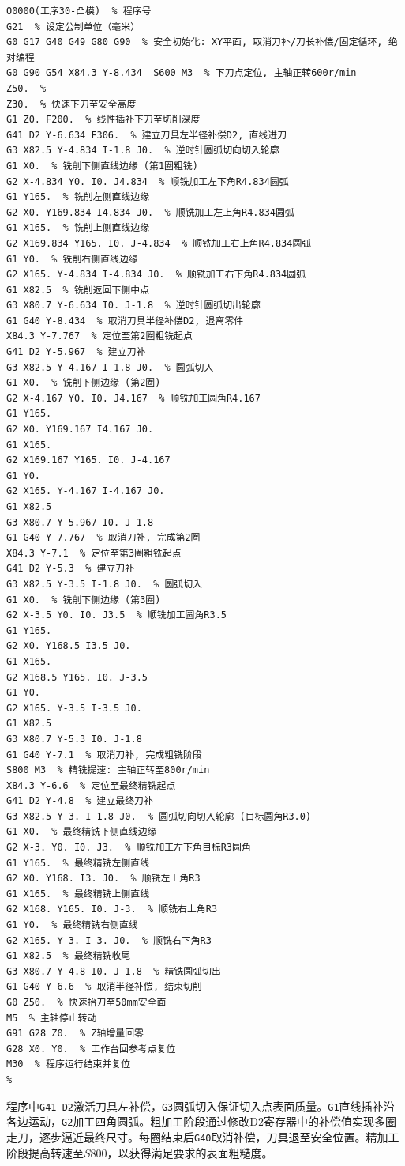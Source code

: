 \documentclass{xautCADreport}
\begin{document}
\begin{lstlisting}[caption={工序30凸模铣侧面程序}]
%
O0000(工序30-凸模)  % 程序号
G21  % 设定公制单位（毫米）
G0 G17 G40 G49 G80 G90  % 安全初始化: XY平面, 取消刀补/刀长补偿/固定循环, 绝对编程
G0 G90 G54 X84.3 Y-8.434  S600 M3  % 下刀点定位, 主轴正转600r/min
Z50.  % 
Z30.  % 快速下刀至安全高度
G1 Z0. F200.  % 线性插补下刀至切削深度
G41 D2 Y-6.634 F306.  % 建立刀具左半径补偿D2, 直线进刀
G3 X82.5 Y-4.834 I-1.8 J0.  % 逆时针圆弧切向切入轮廓
G1 X0.  % 铣削下侧直线边缘 (第1圈粗铣)
G2 X-4.834 Y0. I0. J4.834  % 顺铣加工左下角R4.834圆弧
G1 Y165.  % 铣削左侧直线边缘
G2 X0. Y169.834 I4.834 J0.  % 顺铣加工左上角R4.834圆弧
G1 X165.  % 铣削上侧直线边缘
G2 X169.834 Y165. I0. J-4.834  % 顺铣加工右上角R4.834圆弧
G1 Y0.  % 铣削右侧直线边缘
G2 X165. Y-4.834 I-4.834 J0.  % 顺铣加工右下角R4.834圆弧
G1 X82.5  % 铣削返回下侧中点
G3 X80.7 Y-6.634 I0. J-1.8  % 逆时针圆弧切出轮廓
G1 G40 Y-8.434  % 取消刀具半径补偿D2, 退离零件
X84.3 Y-7.767  % 定位至第2圈粗铣起点
G41 D2 Y-5.967  % 建立刀补
G3 X82.5 Y-4.167 I-1.8 J0.  % 圆弧切入
G1 X0.  % 铣削下侧边缘 (第2圈)
G2 X-4.167 Y0. I0. J4.167  % 顺铣加工圆角R4.167
G1 Y165.
G2 X0. Y169.167 I4.167 J0.
G1 X165.
G2 X169.167 Y165. I0. J-4.167
G1 Y0.
G2 X165. Y-4.167 I-4.167 J0.
G1 X82.5
G3 X80.7 Y-5.967 I0. J-1.8
G1 G40 Y-7.767  % 取消刀补, 完成第2圈
X84.3 Y-7.1  % 定位至第3圈粗铣起点
G41 D2 Y-5.3  % 建立刀补
G3 X82.5 Y-3.5 I-1.8 J0.  % 圆弧切入
G1 X0.  % 铣削下侧边缘 (第3圈)
G2 X-3.5 Y0. I0. J3.5  % 顺铣加工圆角R3.5
G1 Y165.
G2 X0. Y168.5 I3.5 J0.
G1 X165.
G2 X168.5 Y165. I0. J-3.5
G1 Y0.
G2 X165. Y-3.5 I-3.5 J0.
G1 X82.5
G3 X80.7 Y-5.3 I0. J-1.8
G1 G40 Y-7.1  % 取消刀补, 完成粗铣阶段
S800 M3  % 精铣提速: 主轴正转至800r/min
X84.3 Y-6.6  % 定位至最终精铣起点
G41 D2 Y-4.8  % 建立最终刀补
G3 X82.5 Y-3. I-1.8 J0.  % 圆弧切向切入轮廓 (目标圆角R3.0)
G1 X0.  % 最终精铣下侧直线边缘
G2 X-3. Y0. I0. J3.  % 顺铣加工左下角目标R3圆角
G1 Y165.  % 最终精铣左侧直线
G2 X0. Y168. I3. J0.  % 顺铣左上角R3
G1 X165.  % 最终精铣上侧直线
G2 X168. Y165. I0. J-3.  % 顺铣右上角R3
G1 Y0.  % 最终精铣右侧直线
G2 X165. Y-3. I-3. J0.  % 顺铣右下角R3
G1 X82.5  % 最终精铣收尾
G3 X80.7 Y-4.8 I0. J-1.8  % 精铣圆弧切出
G1 G40 Y-6.6  % 取消半径补偿, 结束切削
G0 Z50.  % 快速抬刀至50mm安全面
M5  % 主轴停止转动
G91 G28 Z0.  % Z轴增量回零
G28 X0. Y0.  % 工作台回参考点复位
M30  % 程序运行结束并复位
%
\end{lstlisting}

程序中\texttt{G41 D2}激活刀具左补偿，\texttt{G3}圆弧切入保证切入点表面质量。\texttt{G1}直线插补沿各边运动，\texttt{G2}加工四角圆弧。粗加工阶段通过修改D2寄存器中的补偿值实现多圈走刀，逐步逼近最终尺寸。每圈结束后\texttt{G40}取消补偿，刀具退至安全位置。精加工阶段提高转速至$S800$，以获得满足要求的表面粗糙度。
\end{document}
